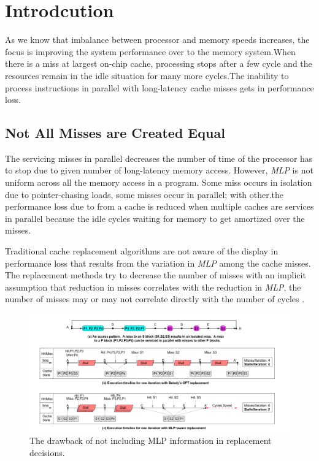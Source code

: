 \documentclass{report}
\begin{document}
\section{Introdcution}

\vspace{.8cm}

As we know that imbalance between processor and memory speeds increases, the focus is improving the system performance over to the memory system.When there is a miss at largest on-chip cache, processing stops after a few cycle and the resources remain in the idle situation for many more cycles.The inability to process instructions in parallel with long-latency cache misses gets in performance loss.

\subsection{Not All Misses are Created Equal}


The servicing misses in parallel decreases the number of time of the processor has to stop due to given number of long-latency memory access. However, \emph{MLP} is not uniform across all the memory access in a program. Some miss occurs in isolation due to pointer-chasing loads, some misses occur in parallel; with other.the performance loss due to from a cache is reduced when multiple caches are services in parallel because the idle cycles waiting for memory to get amortized over the misses.

\vspace{.8cm}
Traditional cache replacement algorithms are not aware of the display in performance loss that results from the variation in \emph{MLP} among the cache misses. The replacement methods try to decrease the number of misses with an implicit assumption that reduction in misses correlates with the reduction in \emph{MLP}, the number of misses may or may not correlate directly with the number of cycles .

\vspace{.8cm}


\begin{figure}[h!]
\includegraphics[width=1\textwidth]{./fig9}
\caption{ The drawback of not including MLP information in replacement decisions.}
\label{fig9}
\end{figure}
\end{document}
